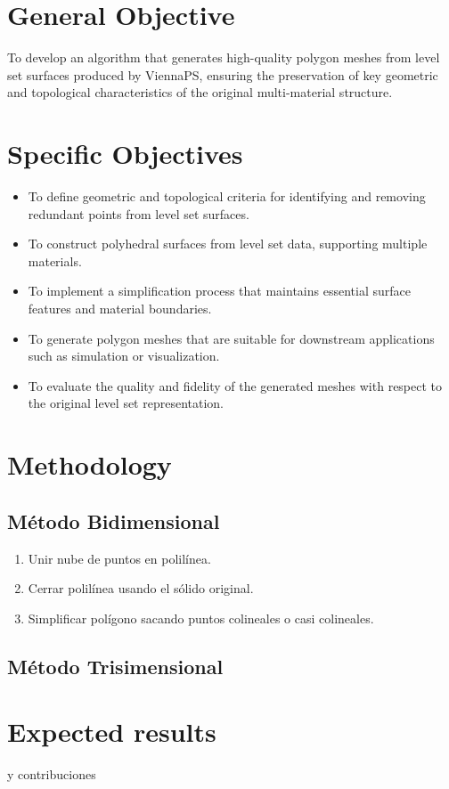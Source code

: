 \documentclass[submission]{eptcs}
\begin{document}
\section{General Objective}

To develop an algorithm that generates high-quality polygon meshes from level set surfaces produced by ViennaPS, ensuring the preservation of key geometric and topological characteristics of the original multi-material structure.



\section{Specific Objectives}

\begin{itemize}
    \item To define geometric and topological criteria for identifying and removing redundant points from level set surfaces.
    \item To construct polyhedral surfaces from level set data, supporting multiple materials.
    \item To implement a simplification process that maintains essential surface features and material boundaries.
    \item To generate polygon meshes that are suitable for downstream applications such as simulation or visualization.
    \item To evaluate the quality and fidelity of the generated meshes with respect to the original level set representation.
\end{itemize}

\section{Methodology}

\subsection{Método Bidimensional}
\begin{enumerate}
    \item Unir nube de puntos en polilínea.
    \item Cerrar polilínea usando el sólido original.
    \item Simplificar polígono sacando puntos colineales o casi colineales.
\end{enumerate}
\subsection{Método Trisimensional}

\section{Expected results}

 y contribuciones

\nocite{*}


\end{document}
